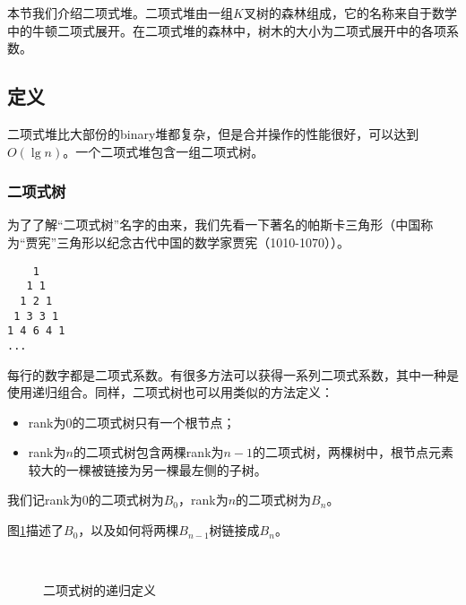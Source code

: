 \documentclass[UTF8]{article}
\begin{document}
本节我们介绍二项式堆。二项式堆由一组$K$叉树的森林组成，它的名称来自于数学中的牛顿二项式展开。在二项式堆的森林中，树木的大小为二项式展开中的各项系数。

\subsection{定义}

二项式堆比大部份的binary堆都复杂，但是合并操作的性能很好，可以达到$O(\lg n)$。一个二项式堆包含一组二项式树。

\subsubsection{二项式树}
\label{Binomial tree} 

为了了解“二项式树”名字的由来，我们先看一下著名的帕斯卡三角形（中国称为“贾宪”三角形以纪念古代中国的数学家贾宪（1010-1070））\cite{wiki-pascal-triangle}。

\begin{verbatim}
    1
   1 1
  1 2 1
 1 3 3 1
1 4 6 4 1
...
\end{verbatim}

每行的数字都是二项式系数。有很多方法可以获得一系列二项式系数，其中一种是使用递归组合。同样，二项式树也可以用类似的方法定义：

\begin{itemize}
\item rank为0的二项式树只有一个根节点；
\item rank为$n$的二项式树包含两棵rank为$n-1$的二项式树，两棵树中，根节点元素较大的一棵被链接为另一棵最左侧的子树。
\end{itemize}

我们记rank为0的二项式树为$B_0$，rank为$n$的二项式树为$B_n$。

图\ref{fig:link-bitree}描述了$B_0$，以及如何将两棵$B_{n-1}$树链接成$B_n$。

\begin{figure}[htbp]
  \centering
   \\
  \caption{二项式树的递归定义} \label{fig:link-bitree}
\end{figure}
\end{document}
